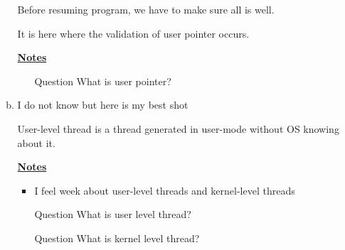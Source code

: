 \documentclass[12pt]{article}
\begin{document}
\begin{enumerate}[1.]
\begin{enumerate}[a)]
        Before resuming program, we have to make sure all is well.

        \bigskip

        It is here where the validation of user pointer occurs.

        \bigskip

        \underline{\textbf{Notes}}

        \begin{itemize}
            \item [\color{blue}Question\color{black}] What is user pointer?
        \end{itemize}

        \item

        I do not know but here is my best shot

        \bigskip

        User-level thread is a thread generated in user-mode without OS knowing about it.

        \bigskip

        \underline{\textbf{Notes}}

        \begin{itemize}
            \item I feel week about user-level threads and kernel-level threads
            \item [\color{blue}Question\color{black}] What is user level thread?
            \item [\color{blue}Question\color{black}] What is kernel level thread?
        \end{itemize}

    \end{enumerate}

\end{enumerate}
\end{document}
